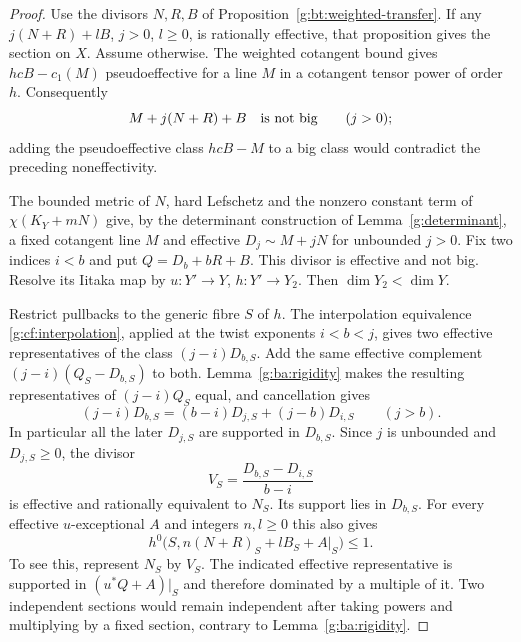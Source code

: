 \begin{proof}
Use the divisors $N,R,B$ of Proposition~\ref{g:bt:weighted-transfer}.
If any $j(N+R)+lB$, $j>0$, $l\geq0$, is rationally effective, that
proposition gives the section on $X$.  Assume otherwise.
The weighted cotangent bound gives $hcB-c_1(M)$ pseudoeffective for a
line $M$ in a cotangent tensor power of order $h$.  Consequently
\[
                    M+j(N+R)+B
                    \quad\hbox{is not big}\qquad(j>0);
\]
adding the pseudoeffective class $hcB-M$ to a big class would contradict
the preceding noneffectivity.

The bounded metric of $N$, hard Lefschetz and the nonzero constant term
of $\chi(K_Y+mN)$ give, by the determinant construction
of Lemma~\ref{g:determinant}, a fixed cotangent line $M$ and
effective $D_j\sim M+jN$ for unbounded $j>0$.
Fix two indices $i<b$ and put $Q=D_b+bR+B$.  This divisor is effective
and not big.  Resolve its Iitaka map by $u:Y'\to Y$, $h:Y'\to Y_2$.
Then $\dim Y_2<\dim Y$.

Restrict pullbacks to the generic fibre $S$ of $h$.
The interpolation equivalence \eqref{g:cf:interpolation}, applied at
the twist exponents $i<b<j$, gives two effective representatives of
the class $(j-i)D_{b,S}$.  Add the same effective complement
$(j-i)(Q_S-D_{b,S})$ to both.  Lemma~\ref{g:ba:rigidity} makes the
resulting representatives of $(j-i)Q_S$ equal, and cancellation gives
\[
           (j-i)D_{b,S}=(b-i)D_{j,S}+(j-b)D_{i,S}
                                                  \qquad(j>b).
\]
In particular all the later $D_{j,S}$ are supported in $D_{b,S}$.
Since $j$ is unbounded and $D_{j,S}\geq0$, the divisor
\[
                   V_S=\frac{D_{b,S}-D_{i,S}}{b-i}
\]
is effective and rationally equivalent to $N_S$.
Its support lies in $D_{b,S}$.  For every effective $u$-exceptional $A$
and integers $n,l\geq0$ this also gives
\begin{equation}\label{g:ba:exceptional-fibre-bound}
 h^0\bigl(S,n(N+R)_S+lB_S+A|_S\bigr)\leq1.
\end{equation}
To see this, represent $N_S$ by $V_S$.  The indicated effective
representative is supported in $(u^*Q+A)|_S$ and therefore dominated
by a multiple of it.  Two independent sections would remain independent
after taking powers and multiplying by a fixed section, contrary to
Lemma~\ref{g:ba:rigidity}.


\end{proof}
